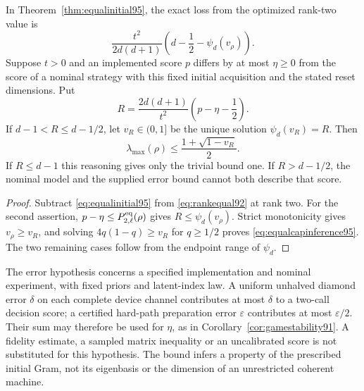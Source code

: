 \begin{corollary}
\label{cor:equalspectralloss95}
In Theorem~\ref{thm:equalinitial95}, the exact loss from the optimized
rank-two value is
\begin{equation}\label{eq:equalspectralloss95}
 \frac{t^2}{2d(d+1)}
                \left(d-\frac12-\psi_d(v_\rho)\right).
\end{equation}
Suppose $t>0$ and an implemented score $p$ differs by at most
$\eta\ge0$ from the score of a nominal strategy with this fixed
initial acquisition and the stated reset dimensions.  Put
\[
 R=\frac{2d(d+1)}{t^2}\left(p-\eta-\frac12\right).
\]
If $d-1<R\le d-1/2$, let $v_R\in(0,1]$ be the unique solution
$\psi_d(v_R)=R$.  Then
\begin{equation}\label{eq:equalcapinference95}
 \lambda_{\max}(\rho)\le\frac{1+\sqrt{1-v_R}}2.
\end{equation}
If $R\le d-1$ this reasoning gives only the trivial bound one.
If $R>d-1/2$, the nominal model and the supplied error bound cannot
both describe that score.
\end{corollary}
\begin{proof}
Subtract \eqref{eq:equalinitial95} from
\eqref{eq:rankequal92} at rank two.  For the second assertion,
$p-\eta\le P_{2,\ell}^{\rm eq}(\rho)$ gives
$R\le\psi_d(v_\rho)$.  Strict monotonicity gives
$v_\rho\ge v_R$, and solving $4q(1-q)\ge v_R$ for $q\ge1/2$
proves \eqref{eq:equalcapinference95}.  The two remaining cases follow
from the endpoint range of $\psi_d$.
\end{proof}
The error hypothesis concerns a specified implementation and nominal
experiment, with fixed priors and latent-index law.  A uniform
unhalved diamond error $\delta$ on each complete device channel
contributes at most $\delta$ to a two-call decision score; a certified
hard-path preparation error $\varepsilon$ contributes at most
$\varepsilon/2$.  Their sum may therefore be used for $\eta$, as
in Corollary~\ref{cor:gamestability91}.  A fidelity estimate, a sampled
matrix inequality or an uncalibrated score is not substituted for this
hypothesis.  The bound infers a property of the prescribed initial Gram,
not its eigenbasis or the dimension of an unrestricted coherent machine.
